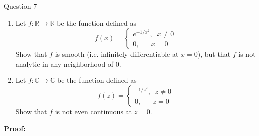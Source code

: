 \documentclass{article}
\newcommand{\R}{\mathbb{R}}
\newcommand{\C}{\mathbb{C}}
\begin{document}
\begin{mathdefinitionbox}{Question 7}
\vskip 0.5cm
\begin{enumerate}[label=(\alph*)]
  \item Let $f : \R \rightarrow \R$ be the function defined as 
  \[ f(x) = \begin{cases}
    e^{-1/x^2}, \;\;x \neq 0 \\
    0, \;\;\;\;\;\;x = 0
  \end{cases} \]
  Show that $f$ is smooth (i.e. infinitely differentiable at $x = 0$), but that $f$ is not analytic in any neighborhood of $0$.

  \vskip 0.5cm
  \item Let $f : \C \rightarrow \C$ be the function defined as 
  \[ f(z) = \begin{cases}
    ^{-1/z^2}, \;\;z \neq 0 \\
    0, \;\;\;\;\;\;z = 0
  \end{cases} \]
  Show that $f$ is not even continuous at $z = 0$.
\end{enumerate}
\end{mathdefinitionbox}

\vskip 0.5cm
\underline{\textbf{Proof:}}
\end{document}
